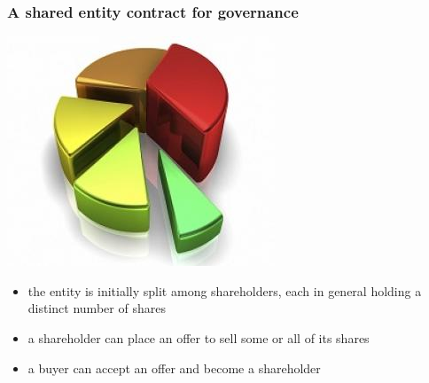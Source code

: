 \documentclass[11pt]{beamer}  %
\begin{document}
\begin{frame}\frametitle{A shared entity contract for governance}

  \begin{center}
    \includegraphics[scale=0.38,clip=false]{pictures/shares.jpg}
  \end{center}

  \begin{itemize}
  \item the entity is initially split among \alert{shareholders},
    each in general holding a distinct number of \alert{shares}
  \item a shareholder can \alert{place an offer} to sell some or all of its shares
  \item a buyer can \alert{accept} an offer and become a shareholder
  \end{itemize}

\end{frame}
\end{document}
